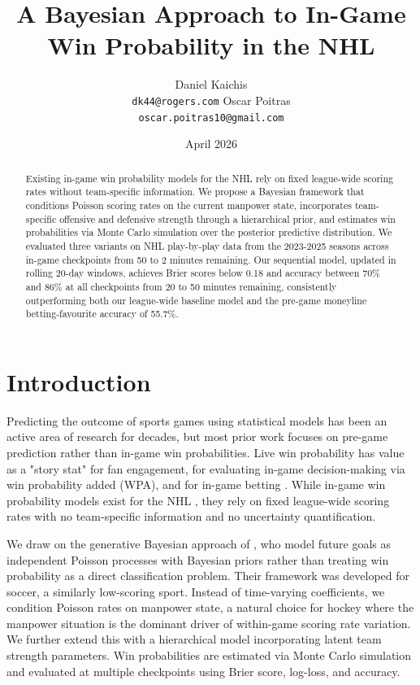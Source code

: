 \documentclass{article}
\title{A Bayesian Approach to In-Game Win Probability in the NHL}
\author{%
  Daniel Kaichis\\
  \texttt{dk44@rogers.com}
  \And
  Oscar Poitras\\
  \texttt{oscar.poitras10@gmail.com}
}
\date{April 2026}
\begin{document}
\maketitle

\begin{abstract}
Existing in-game win probability models for the NHL rely on fixed league-wide scoring rates without team-specific information. We propose a Bayesian framework that conditions Poisson scoring rates on the current manpower state, incorporates team-specific offensive and defensive strength through a hierarchical prior, and estimates win probabilities via Monte Carlo simulation over the posterior predictive distribution. We evaluated three variants on NHL play-by-play data from the 2023-2025 seasons across in-game checkpoints from 50 to 2 minutes remaining. Our sequential model, updated in rolling 20-day windows, achieves Brier scores below 0.18 and accuracy between 70\% and 86\% at all checkpoints from 20 to 50 minutes remaining, consistently outperforming both our league-wide baseline model and the pre-game moneyline betting-favourite accuracy of 55.7\%.
\end{abstract}


\section{Introduction}

Predicting the outcome of sports games using statistical models has been an active area of research for decades, but most prior work focuses on pre-game prediction rather than in-game win probabilities. Live win probability has value as a "story stat" for fan engagement, for evaluating in-game decision-making via win probability added (WPA), and for in-game betting \citep{robberechts2021bayesian}. While in-game win probability models exist for the NHL \citep{pettigrew2015assessing}, they rely on fixed league-wide scoring rates with no team-specific information and no uncertainty quantification.


We draw on the generative Bayesian approach of \citet{robberechts2021bayesian}, who model future goals as independent Poisson processes with Bayesian priors rather than treating win probability as a direct classification problem. Their framework was developed for soccer, a similarly low-scoring sport. 
Instead of time-varying coefficients, we condition Poisson rates on manpower state, a natural choice for hockey where the manpower situation is the dominant driver of within-game scoring rate variation. We further extend this with a hierarchical model incorporating latent team strength parameters. Win probabilities are estimated via Monte Carlo simulation and evaluated at multiple checkpoints using Brier score, log-loss, and accuracy.
\end{document}
